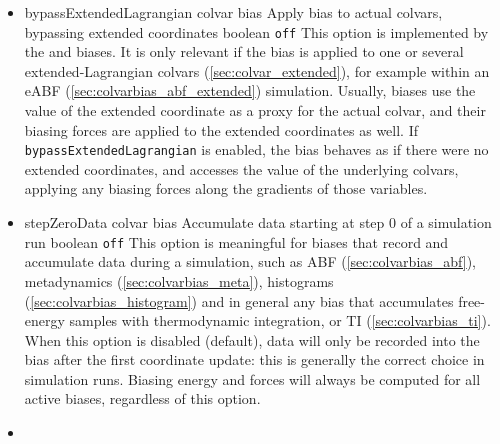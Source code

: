 \begin{itemize}
\item %
  \keydef
    {bypassExtendedLagrangian}{%
    colvar bias}{%
    Apply bias to actual colvars, bypassing extended coordinates}{%
    boolean}{%
    \texttt{off}}{%
    This option is implemented by the  and
     biases.
    It is only relevant if the bias is applied to one or several extended-Lagrangian colvars (\ref{sec:colvar_extended}),
    for example within an eABF (\ref{sec:colvarbias_abf_extended}) simulation.
    Usually, biases use the value of the extended coordinate as a proxy for the actual colvar, and their biasing forces are applied to the extended coordinates as well.
    If \texttt{bypassExtendedLagrangian} is enabled, the bias behaves as if there were no extended coordinates, and accesses the value of the underlying colvars, applying any biasing forces along the gradients of those variables.}

\item %
  \keydef
    {stepZeroData}{%
    colvar bias}{%
    Accumulate data starting at step 0 of a simulation run}{%
    boolean}{%
    \texttt{off}}{%
    This option is meaningful for biases that record and accumulate data during a simulation, such as ABF (\ref{sec:colvarbias_abf}), metadynamics (\ref{sec:colvarbias_meta}), histograms (\ref{sec:colvarbias_histogram}) and in general any bias that accumulates free-energy samples with thermodynamic integration, or TI (\ref{sec:colvarbias_ti}).
    When this option is disabled (default), data will only be recorded into the bias after the first coordinate update: this is generally the correct choice in simulation runs.
    Biasing energy and forces will always be computed for all active biases, regardless of this option.
  }

\item %


\end{itemize}
